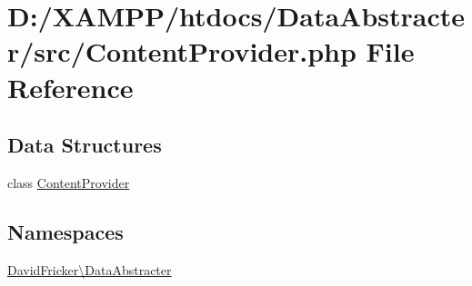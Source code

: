 \hypertarget{_content_provider_8php}{}\section{D\+:/\+X\+A\+M\+P\+P/htdocs/\+Data\+Abstracter/src/\+Content\+Provider.php File Reference}
\label{_content_provider_8php}
\subsection*{Data Structures}
\begin{DoxyCompactItemize}
\item 
class \hyperlink{class_david_fricker_1_1_data_abstracter_1_1_content_provider}{Content\+Provider}
\end{DoxyCompactItemize}
\subsection*{Namespaces}
\begin{DoxyCompactItemize}
\item 
 \hyperlink{namespace_david_fricker_1_1_data_abstracter}{David\+Fricker\textbackslash{}\+Data\+Abstracter}
\end{DoxyCompactItemize}
